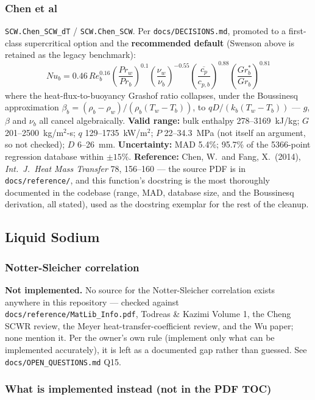 \documentclass[11pt]{article}
\newcommand{\code}[1]{\texttt{#1}}
\newcommand{\notimpl}{\textbf{Not implemented.}}
\begin{document}
\subsubsection{Chen et al}

\code{SCW.Chen\_SCW\_dT} / \code{SCW.Chen\_SCW}. Per \code{docs/DECISIONS.md}, promoted
to a first-class supercritical option and the \textbf{recommended default}
(Swenson above is retained as the legacy benchmark):
\[
  Nu_b = 0.46\,Re_b^{0.16}\left(\frac{Pr_w}{Pr_b}\right)^{0.1}\left(\frac{\nu_w}{\nu_b}\right)^{-0.55}\left(\frac{\overline{c_p}}{c_{p,b}}\right)^{0.88}\left(\frac{Gr_b^*}{Gr_b}\right)^{0.81}
\]
where the heat-flux-to-buoyancy Grashof ratio collapses, under the Boussinesq
approximation $\beta_b=(\rho_b-\rho_w)/(\rho_b(T_w-T_b))$, to $qD/(k_b(T_w-T_b))$ ---
$g$, $\beta$ and $\nu_b$ all cancel algebraically. \textbf{Valid range:} bulk enthalpy
278--3169~kJ/kg; $G$ 201--2500~kg/m$^2$-s; $q$ 129--1735~kW/m$^2$; $P$
22--34.3~MPa (not itself an argument, so not checked); $D$ 6--26~mm.
\textbf{Uncertainty:} MAD 5.4\%; 95.7\% of the 5366-point regression database within
$\pm15\%$. \textbf{Reference:} Chen, W.\ and Fang, X.\ (2014), \emph{Int.\ J.\ Heat Mass
Transfer} 78, 156--160 --- the source PDF is in \code{docs/reference/}, and this
function's docstring is the most thoroughly documented in the codebase (range, MAD,
database size, and the Boussinesq derivation, all stated), used as the docstring
exemplar for the rest of the cleanup.

\subsection{Liquid Sodium}

\subsubsection{Notter-Sleicher correlation}

\notimpl{} No source for the Notter-Sleicher correlation exists anywhere in this
repository --- checked against \code{docs/reference/MatLib\_Info.pdf}, Todreas \&
Kazimi Volume 1, the Cheng SCWR review, the Meyer heat-transfer-coefficient review, and
the Wu paper; none mention it. Per the owner's own rule (implement only what can be
implemented accurately), it is left as a documented gap rather than guessed. See
\code{docs/OPEN\_QUESTIONS.md} Q15.

\subsubsection*{What is implemented instead (not in the PDF TOC)}
\end{document}
